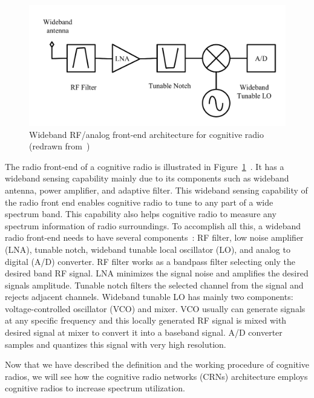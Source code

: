 \begin{figure}[!htbp]
\begin{center}
    \includegraphics[scale=0.5]{myFigures/RFFrontEnd}
    \caption{Wideband RF/analog front-end architecture for cognitive radio (redrawn from~\cite{cabric2004implementation})}
    \label{fig:RFFrontEnd}
\end{center}
\end{figure}

The radio front-end of a cognitive radio is illustrated in Figure~\ref{fig:RFFrontEnd}~\cite{cabric2004implementation}. It has a wideband sensing capability mainly due to its components such as wideband antenna, power amplifier, and adaptive filter. This wideband sensing capability of the radio front end enables cognitive radio to tune to any part of a wide spectrum band. This capability also helps cognitive radio to measure any spectrum information of radio surroundings. To accomplish all this, a wideband radio front-end needs to have several components~\cite{akyildiz2006next}: RF filter, low noise amplifier (LNA), tunable notch, wideband tunable local oscillator (LO), and analog to digital (A/D) converter. RF filter works as a bandpass filter selecting only the desired band RF signal. LNA minimizes the signal noise and amplifies the desired signals amplitude. Tunable notch filters the selected channel from the signal and rejects adjacent channels. Wideband tunable LO has mainly two components: voltage-controlled oscillator (VCO) and mixer. VCO usually can generate signals at any specific frequency and this locally generated RF signal is mixed with desired signal at mixer to convert it into a baseband signal. A/D converter samples and quantizes this signal with very high resolution.

Now that we have described the definition and the working procedure of cognitive radios, we will see how the cognitive radio networks (CRNs) architecture employs cognitive radios to increase spectrum utilization. 

